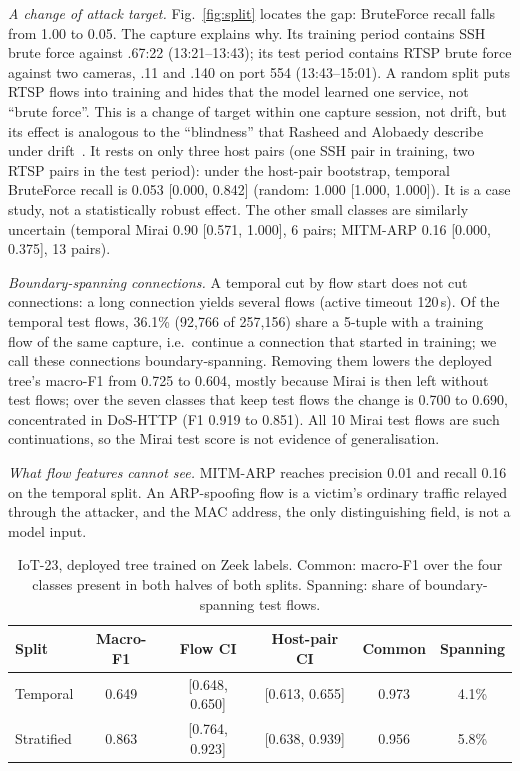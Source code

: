 \emph{A change of attack target.} Fig.~\ref{fig:split} locates the gap: BruteForce recall falls from 1.00 to 0.05. The capture explains why. Its training period contains SSH brute force against .67:22 (13:21--13:43); its test period contains RTSP brute force against two cameras, .11 and .140 on port 554 (13:43--15:01). A random split puts RTSP flows into training and hides that the model learned one service, not ``brute force''. This is a change of target within one capture session, not drift, but its effect is analogous to the ``blindness'' that Rasheed and Alobaedy describe under drift~\cite{rasheed2026drift}. It rests on only three host pairs (one SSH pair in training, two RTSP pairs in the test period): under the host-pair bootstrap, temporal BruteForce recall is 0.053 [0.000, 0.842] (random: 1.000 [1.000, 1.000]). It is a case study, not a statistically robust effect. The other small classes are similarly uncertain (temporal Mirai 0.90 [0.571, 1.000], 6 pairs; MITM-ARP 0.16 [0.000, 0.375], 13 pairs).

\emph{Boundary-spanning connections.} A temporal cut by flow start does not cut connections: a long connection yields several flows (active timeout 120\,s). Of the temporal test flows, 36.1\% (92,766 of 257,156) share a 5-tuple with a training flow of the same capture, i.e.\ continue a connection that started in training; we call these connections boundary-spanning. Removing them lowers the deployed tree's macro-F1 from 0.725 to 0.604, mostly because Mirai is then left without test flows; over the seven classes that keep test flows the change is 0.700 to 0.690, concentrated in DoS-HTTP (F1 0.919 to 0.851). All 10 Mirai test flows are such continuations, so the Mirai test score is not evidence of generalisation.

\emph{What flow features cannot see.} MITM-ARP reaches precision 0.01 and recall 0.16 on the temporal split. An ARP-spoofing flow is a victim's ordinary traffic relayed through the attacker, and the MAC address, the only distinguishing field, is not a model input.

\begin{table}[t]
\centering
\caption{IoT-23, deployed tree trained on Zeek labels. Common: macro-F1 over the four classes present in both halves of both splits. Spanning: share of boundary-spanning test flows.}
\label{tab:iot23split}
\footnotesize
\setlength{\tabcolsep}{2.5pt}
\begin{tabular}{lccccc}
\hline
Split & Macro-F1 & Flow CI & Host-pair CI & Common & Spanning \\
\hline
Temporal   & 0.649 & [0.648, 0.650] & [0.613, 0.655] & 0.973 & 4.1\% \\
Stratified & 0.863 & [0.764, 0.923] & [0.638, 0.939] & 0.956 & 5.8\% \\
\hline
\end{tabular}
\end{table}

